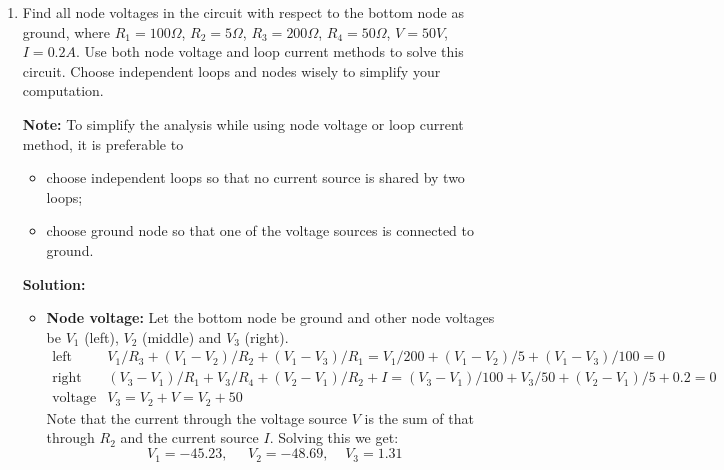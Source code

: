 \begin{enumerate}
\item Find all node voltages in the circuit with respect to the bottom node as
  ground, where $R_1=100\Omega$, $R_2=5\Omega$, $R_3=200\Omega$, $R_4=50\Omega$, 
  $V=50V$, $I=0.2A$.  Use both node voltage and loop current methods to solve 
  this circuit. Choose independent loops and nodes wisely to simplify your
  computation.  


  {\bf Note:} To simplify the analysis while using node voltage or loop current 
  method, it is preferable to
  \begin{itemize}
  \item choose independent loops so that no current source is shared by two 
    loops;
  \item choose ground node so that one of the voltage sources is connected
    to ground.
  \end{itemize}

  {\bf Solution:}
  \begin{itemize}
  \item {\bf Node voltage: }
    Let the bottom node be ground and other node voltages be 
    $V_1$ (left), $V_2$ (middle) and $V_3$ (right). 
    \[
    \begin{array}{ll}
      \mbox{left node:} & V_1/R_3+(V_1-V_2)/R_2+(V_1-V_3)/R_1
      =V_1/200+(V_1-V_2)/5+(V_1-V_3)/100=0\\
      \mbox{right node:} & 
      (V_3-V_1)/R_1+V_3/R_4+(V_2-V_1)/R_2+I
      =(V_3-V_1)/100+V_3/50+(V_2-V_1)/5+0.2=0\\
      \mbox{voltage source:} & V_3=V_2+V=V_2+50 
    \end{array} 
    \]
    Note that the current through the voltage source $V$ is the sum of
    that through $R_2$ and the current source $I$. Solving this we get: 
    \[
    V_1=-45.23,\;\;\;\;\;V_2=-48.69,\;\;\;\;V_3=1.31 
    \]



\end{itemize}
\end{enumerate}
